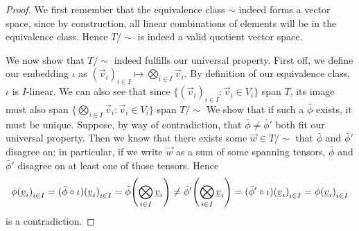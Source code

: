 \begin{proof}
    We first remember that the equivalence class \(\sim\) indeed forms a vector space,
    since by construction,
    all linear combinations of elements will be in the equivalence class.
    Hence \(T/{\sim}\) is indeed a valid quotient vector space.

    We now show that \(T/{\sim}\) indeed fulfills our universal property.
    First off, we define our embedding \(\iota\) as
    \({(\vec{v}_i)}_{i \in I} \mapsto \bigotimes_{i \in I} \vec{v}_i\).
    By definition of our equivalence class, \(\iota\) is \(I\)-linear.
    We can also see that since \(\{{(\vec{v}_i)}_{i \in I} : \vec{v}_i \in V_i\}\) span \(T\),
    its image must also span \(\{\bigotimes_{i \in I} \vec{v}_i : \vec{v}_i \in V_i\}\) span \(T/{\sim}\)
    We show that if such a \(\bar{\phi}\) exists, it must be unique.
    Suppose, by way of contradiction,
    that \(\bar{\phi}\neq\bar{\phi}'\) both fit our universal property.
    Then we know that there exists some \(\vec{w} \in T/{\sim}\)
    that \(\bar{\phi}\) and \(\bar{\phi}'\) disagree on;
    in particular, if we write \(\vec{w}\) as a sum of some spanning tensors,
    \(\bar{\phi}\) and \(\bar{\phi}'\) disagree on at least one of those tensors.
    Hence
    \begin{equation*}
        \phi{(\vec{v}_i)}_{i \in I}
        = (\bar{\phi}\circ\iota){(\vec{v}_i)}_{i \in I}
        = \bar{\phi}\pqty{\bigotimes_{i \in I} \vec{v}_i}
        \neq \bar{\phi}'\pqty{\bigotimes_{i \in I} \vec{v}_i}
        = (\bar{\phi}'\circ\iota){(\vec{v}_i)}_{i \in I}
        = \phi{(\vec{v}_i)}_{i \in I}
    \end{equation*}
    is a contradiction.


\end{proof}
